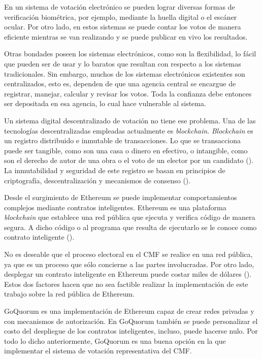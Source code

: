 En un sistema de votaci\'on electr\'onico se  pueden lograr diversas formas de verificaci\'on biom\'etrica, por ejemplo, mediante la huella digital o el esc\'aner ocular. Por otro lado, en estos sistemas se puede contar los votos de manera eficiente mientras se van realizando y se  puede publicar en vivo los resultados. 

Otras bondades poseen los sistemas electrónicos, como son la flexibilidad, lo fácil que pueden ser de usar y lo baratos que resultan con respecto a los sistemas tradicionales. Sin embargo, muchos de los sistemas electrónicos existentes son centralizados, esto es, dependen de que una agencia central se encargue de registrar, manejar, calcular y revisar los votos. Toda la confianza debe entonces ser depositada en esa agencia, lo cual hace vulnerable al sistema.
 
Un sistema digital descentralizado de votación no tiene ese problema. Una de las tecnologías descentralizadas empleadas actualmente es \textit{blockchain}.   \textit{Blockchain} es un registro distribuido e inmutable  de transacciones. Lo que se transacciona puede ser tangible, como son  una casa o dinero en efectivo, o intangible, como son el derecho de autor de una obra o el voto de un elector por un candidato (\cite{blockchain-ibm}). La inmutabilidad y seguridad de este registro se basan en principios de  criptografía, descentralizaci\'on y mecanismos de consenso (\cite{blockch-security-ibm}). 



Desde el surgimiento de Ethereum se puede implementar comportamientos complejos mediante contratos inteligentes. Ethereum es una plataforma \textit{blockchain} que establece una red p\'ublica que ejecuta y verifica c\'odigo de manera segura. A dicho c\'odigo o al programa que resulta de ejecutarlo se le conoce como contrato inteligente (\cite{eth-aws}).  

No es deseable que el proceso electoral en el CMF se realice en una red p\'ublica, ya que es un proceso que s\'olo concierne a las partes involucradas. Por otro lado, desplegar un contrato inteligente en Ethereum puede costar miles de d\'olares (\cite{eth-deploy}). Estos dos factores hacen que no sea factible realizar la implementaci\'on de este trabajo sobre la red p\'ublica de Ethereum. 

GoQuorum es una implementaci\'on de Ethereum capaz de crear redes privadas y con mecanismos de autorizaci\'on. En GoQuorum tambi\'en se puede personalizar el costo del despliegue de los contratos inteligentes, incluso, puede hacerse nulo. Por todo lo dicho anteriormente, GoQuorum es una buena opci\'on en la que implementar el sistema de votaci\'on representativa del CMF.


